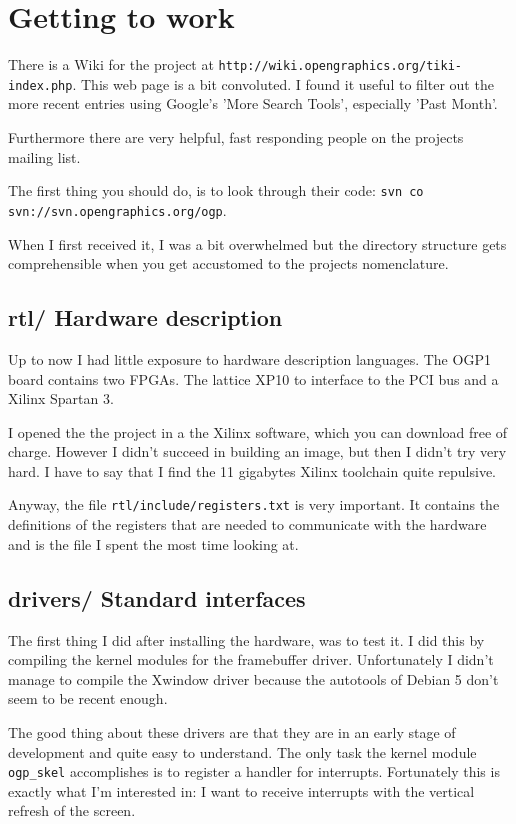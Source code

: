 \documentclass[twocolumn,DIV19]{scrartcl}
\begin{document}
\section{Getting to work}
There is a Wiki for the project at
\verb!http://wiki.opengraphics.org/tiki-index.php!. This web page is a
bit convoluted. I found it useful to filter out the more recent
entries using Google's 'More Search Tools', especially 'Past Month'.

Furthermore there are very helpful, fast responding people on the
projects mailing list.

The first thing you should do, is to look through their code:
\verb!svn co svn://svn.opengraphics.org/ogp!.

When I first received it, I was a bit overwhelmed but the directory
structure gets comprehensible when you get accustomed to the projects
nomenclature.

\subsection{rtl/ Hardware description}
Up to now I had little exposure to hardware description languages. The
OGP1 board contains two FPGAs. The lattice XP10 to interface to the
PCI bus and a Xilinx Spartan 3.

I opened the the project in a the Xilinx software, which you can
download free of charge. However I didn't succeed in building an
image, but then I didn't try very hard. I have to say that I find the
11 gigabytes Xilinx toolchain quite repulsive.

Anyway, the file \verb!rtl/include/registers.txt! is very
important. It contains the definitions of the registers that are
needed to communicate with the hardware and is the file I spent the
most time looking at.

\subsection{drivers/ Standard interfaces}
The first thing I did after installing the hardware, was to test it.
I did this by compiling the kernel modules for the framebuffer driver.
Unfortunately I didn't manage to compile the Xwindow driver because
the autotools of Debian 5 don't seem to be recent enough.

The good thing about these drivers are that they are in an early stage
of development and quite easy to understand. The only task the kernel
module \verb!ogp_skel! accomplishes is to register a handler for
interrupts. Fortunately this is exactly what I'm interested in: I want
to receive interrupts with the vertical refresh of the screen.
\end{document}
